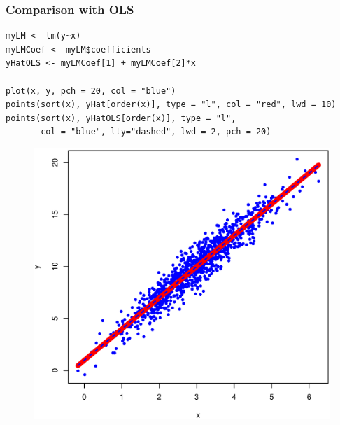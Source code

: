 \documentclass[10pt]{beamer}
\begin{document}
\begin{frame}[fragile]
  \frametitle{Comparison with OLS}

\begin{verbatim}
myLM <- lm(y~x)
myLMCoef <- myLM$coefficients
yHatOLS <- myLMCoef[1] + myLMCoef[2]*x

plot(x, y, pch = 20, col = "blue")
points(sort(x), yHat[order(x)], type = "l", col = "red", lwd = 10)
points(sort(x), yHatOLS[order(x)], type = "l",
       col = "blue", lty="dashed", lwd = 2, pch = 20)
\end{verbatim}
\end{frame}


\begin{frame}[plain]
  \begin{figure}
    \centering
    \includegraphics[height=\textheight]{OLSvsML}
  \end{figure}
\end{frame}
\end{document}
